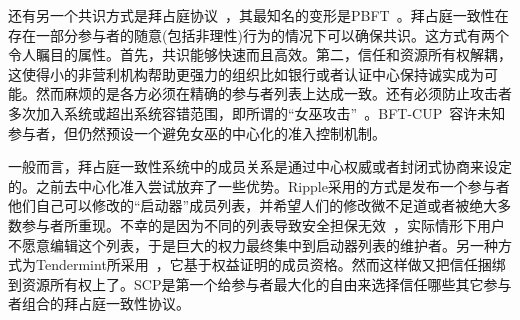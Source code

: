 还有另一个共识方式是拜占庭协议~，其最知名的变形是PBFT~。拜占庭一致性在存在一部分参与者的随意(包括非理性)行为的情况下可以确保共识。这方式有两个令人瞩目的属性。首先，共识能够快速而且高效。第二，信任和资源所有权解耦，这使得小的非营利机构帮助更强力的组织比如银行或者认证中心保持诚实成为可能。然而麻烦的是各方必须在精确的参与者列表上达成一致。还有必须防止攻击者多次加入系统或超出系统容错范围，即所谓的``女巫攻击''~。BFT-CUP~容许未知参与者，但仍然预设一个避免女巫的中心化的准入控制机制。

一般而言，拜占庭一致性系统中的成员关系是通过中心权威或者封闭式协商来设定的。之前去中心化准入尝试放弃了一些优势。Ripple采用的方式是发布一个参与者他们自己可以修改的``启动器''成员列表，并希望人们的修改微不足道或者被绝大多数参与者所重现。不幸的是因为不同的列表导致安全担保无效~，实际情形下用户不愿意编辑这个列表，于是巨大的权力最终集中到启动器列表的维护者。另一种方式为Tendermint所采用~，它基于权益证明的成员资格。然而这样做又把信任捆绑到资源所有权上了。SCP是第一个给参与者最大化的自由来选择信任哪些其它参与者组合的拜占庭一致性协议。